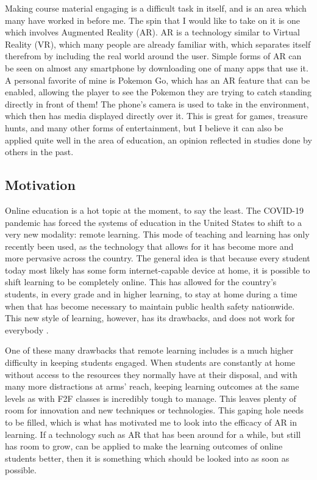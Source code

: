 \documentclass[sigconf]{acmart}
\begin{document}
Making course material engaging is a difficult task in itself, and is an area which many have worked in before me. The spin that I would like to take on it is one which involves Augmented Reality (AR). AR is a technology similar to Virtual Reality (VR), which many people are already familiar with, which separates itself therefrom by including the real world around the user. Simple forms of AR can be seen on almost any smartphone by downloading one of many apps that use it. A personal favorite of mine is Pokemon Go, which has an AR feature that can be enabled, allowing the player to see the Pokemon they are trying to catch standing directly in front of them! The phone's camera is used to take in the environment, which then has media displayed directly over it. This is great for games, treasure hunts, and many other forms of entertainment, but I believe it can also be applied quite well in the area of education, an opinion reflected in studies done by others in the past.

\subsection{Motivation}
Online education is a hot topic at the moment, to say the least. The COVID-19 pandemic has forced the systems of education in the United States to shift to a very new modality: remote learning. This mode of teaching and learning has only recently been used, as the technology that allows for it has become more and more pervasive across the country. The general idea is that because every student today most likely has some form internet-capable device at home, it is possible to shift learning to be completely online. This has allowed for the country's students, in every grade and in higher learning, to stay at home during a time when that has become necessary to maintain public health safety nationwide. This new style of learning, however, has its drawbacks, and does not work for everybody \cite{kearsley02}.

One of these many drawbacks that remote learning includes is a much higher difficulty in keeping students engaged. When students are constantly at home without access to the resources they normally have at their disposal, and with many more distractions at arms' reach, keeping learning outcomes at the same levels as with F2F classes is incredibly tough to manage. This leaves plenty of room for innovation and new techniques or technologies. This gaping hole needs to be filled, which is what has motivated me to look into the efficacy of AR in learning. If a technology such as AR that has been around for a while, but still has room to grow, can be applied to make the learning outcomes of online students better, then it is something which should be looked into as soon as possible.
\end{document}
